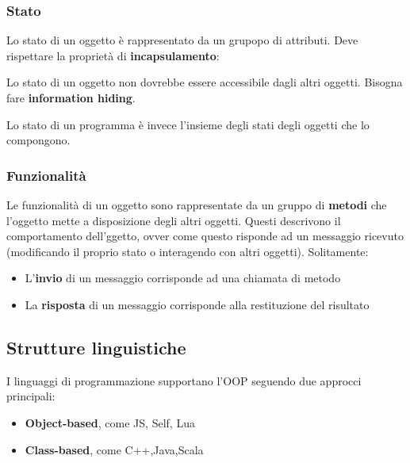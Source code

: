 \subsubsection{Stato}
Lo stato di un oggetto è rappresentato da un grupopo di attributi. Deve rispettare la proprietà di \textbf{incapsulamento}:
\begin{definition}[Incapsulamento]
	Lo stato di un oggetto non dovrebbe essere accessibile dagli altri oggetti. Bisogna fare \textbf{information hiding}.
\end{definition}
Lo stato di un programma è invece l'insieme degli stati degli oggetti che lo compongono.
\subsubsection{Funzionalità}
Le funzionalità di un oggetto sono rappresentate da un gruppo di \textbf{metodi} che l'oggetto mette a disposizione degli altri oggetti. Questi descrivono il comportamento dell'ggetto, ovver come questo risponde ad un messaggio ricevuto (modificando il proprio stato o interagendo con altri oggetti). Solitamente:
\begin{itemize}
	\item L'\textbf{invio} di un messaggio corrisponde ad una chiamata di metodo
	\item La \textbf{risposta} di un messaggio corrisponde alla restituzione del risultato
\end{itemize}

\subsection{Strutture linguistiche}
I linguaggi di programmazione supportano l'OOP seguendo due approcci principali:
\begin{itemize}
	\item \textbf{Object-based}, come JS, Self, Lua
	\item \textbf{Class-based}, come C++,Java,Scala
\end{itemize}
